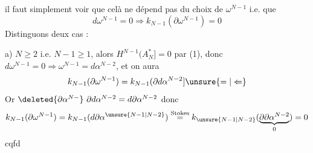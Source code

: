 il faut simplement voir que celà ne dépend pas du choix de $\omega^{N-1}$ i.e. que 
\[
 d\omega^{N-1}=0\Longrightarrow k_{N-1}(\partial\omega^{N-1})=0
\]
Distinguons deux cas :

a) $N\geq2$ i.e. $N-1\geq1$, alors $H^{N-1}(A_N^*]=0$ par (1), donc $d\omega^{N-1}=0\Rightarrow\omega^{N-1}=d\alpha^{N-2}$, et on aura
\[
 k_{N-1}(\partial\omega^{N-1})=k_{N-1}(\partial d\alpha^{N-2}]\unsure{=|\Leftarrow}
\]
Or $\deleted{\partial\alpha^{N-}}\ \partial d\alpha^{N-2}=d\partial\alpha^{N-2}$ donc 
\[
 k_{N-1}(\partial\omega^{N-1})=k_{N-1}(d\partial\alpha^{\unsure{N-1|N-2}})
 \overset{\text{Stokes}}{=}k_{\unsure{N-1|N-2}}(\underbrace{\partial\partial\alpha^{N-2}}_0)=0
\]
cqfd

